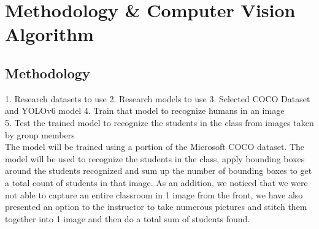 \section{Methodology \& Computer Vision Algorithm}
\label{sec:method}
\subsection{Methodology}
\label{subsec:method}
1. Research datasets to use
2. Research models to use
3. Selected COCO Dataset and YOLOv6 model
4. Train that model to recognize humans in an image\\
5. Test the trained model to recognize the students in the class from images taken by group members\\

The model will be trained using a portion of the Microsoft COCO dataset. The model will be used to recognize the students in the class, apply bounding boxes around the students recognized and sum up the number of bounding boxes to get a total count of students in that image. As an addition, we noticed that we were not able to capture an entire classroom in 1 image from the front, we have also presented an option to the instructor to take numerous pictures and stitch them together into 1 image and then do a total sum of students found.\\ 

